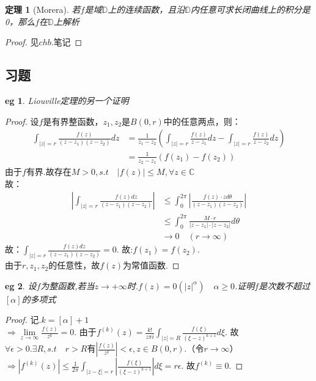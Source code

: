 \documentclass[b5paper,decoration]{qyxf-book}%
\newtheorem{mypro}{定理}[section]%
\newtheorem*{eg}{eg}%
\begin{document}
\begin{mypro}[Morera]
    若$f$是域$\mathbb{D}$上的连续函数，且沿$\mathbb{D}$内任意可求长闭曲线上的积分是0，那么$f$在$\mathbb{D}$上解析
\end{mypro}
\begin{proof}
    见$chb.$笔记
\end{proof}

\subsection*{习题}
\begin{eg}
    {\rm Liouville}定理的另一个证明
\end{eg}
\begin{proof}
    设$f$是有界整函数，$z_{1},z_{2}$是$B(0,r)$中的任意两点，则：
    \begin{align*}
        \int_{|z|=r}\frac{f(z)}{(z-z_1)(z-z_2)}dz
        &=\frac{1}{z_1-z_2}
        \left(\int_{|z|=r}\frac{f(z)}{z-z_1}dz-\int_{|z|=r}\frac{f(z)}{z-z_2}dz\right)\\
        &=\frac{1}{z_2-z_1}\left(f(z_1)-f(z_2)\right)
    \end{align*}
    由于$f$有界.故存在$M>0,s.t\quad|f(z)|\leq M,\forall z\in \mathbb{C}$\\
    故：
    \begin{align*}
        \left|\int_{|z|=r}\frac{f(z)dz}{(z-z_1)(z-z_2)}\right|
        &\leq\int_0^{2\pi}\left|\frac{f(z)\cdot zd\theta}{(z-z_1)(z-z_2)}\right|\\
        &\leq\int_0^{2\pi}\frac{M\cdot r}{|z-z_1|\cdot|z-z_2|}d\theta\\
        &\rightarrow 0\quad(r\rightarrow\infty)
    \end{align*}
    故：$\displaystyle{\int_{|z|=r}\frac{f(z)dz}{(z-z_1)(z-z_2)}=0}$. \quad 故:$\displaystyle{f(z_1)=f(z_2)}$.\\
    由于$r,z_1,z_2$的任意性，故$f(z)$为常值函数.
\end{proof}

\begin{eg}
    设$f$为整函数,若当$z\rightarrow+\infty$时.$f(z)=0(|z|^\alpha)\quad\alpha\geq0$.证明$f$是次数不超过$[\alpha]$的多项式
\end{eg}
\begin{proof}
    记.$k=[\alpha]+1$\\
    $\displaystyle{\Rightarrow\lim\limits_{z\to\infty}\frac{f(z)}{z^k}=0}$.
    由于$\displaystyle{f^{(k)}(z)=\frac{k!}{z\pi i}\int_{|z|=R}\frac{f(\xi)}{(\xi-z)^{k+1}}d\xi}$.
    故$\forall\epsilon>0.\exists R, s.t\quad r>R$有$\displaystyle{\left|\frac{f(z)}{z^k}\right|<\epsilon,z\in B(0,r)}$.（令$r\rightarrow\infty$）\\
    $\displaystyle{\Rightarrow\left|f^{(k)}(z)\right|\leq\frac{1}{2\pi}\int_{|z-\xi|=r}\left|\frac{f(\xi)}{(\xi-z)^{k+1}}\right|d\xi=r\epsilon}$.
    故$f^{(k)}\equiv0$.
\end{proof}
\end{document}
